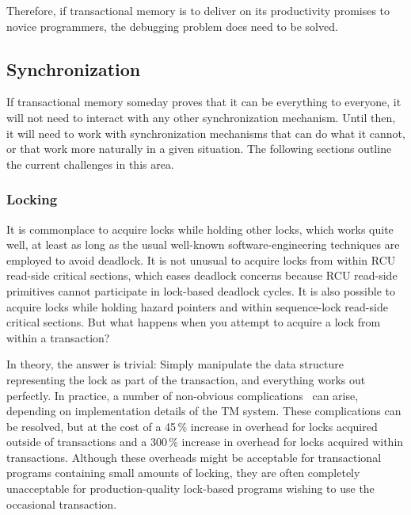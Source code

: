 Therefore, if transactional memory is to deliver on its productivity
promises to novice programmers, the debugging problem does need to
be solved.

\subsection{Synchronization}
\label{sec:future:Synchronization}

If transactional memory someday proves that it can be everything to everyone,
it will not need to interact with any other synchronization mechanism.
Until then, it will need to work with synchronization mechanisms that
can do what it cannot, or that work more naturally in a given situation.
The following sections outline the current challenges in this area.

\subsubsection{Locking}
\label{sec:future:Locking}

It is commonplace to acquire locks while holding other locks, which works
quite well, at least as long as the usual well-known software-engineering
techniques are employed to avoid deadlock.
It is not unusual to acquire locks from within RCU read-side critical
sections, which eases deadlock concerns because RCU read-side primitives
cannot participate in lock-based deadlock cycles.
It is also possible to acquire locks while holding hazard pointers and
within sequence-lock read-side critical sections.
But what happens when you attempt to acquire a lock from within a transaction?

In theory, the answer is trivial:
Simply manipulate the data structure representing the lock as part of
the transaction, and everything works out perfectly.
In practice, a number of non-obvious complications~\cite{Volos2008TRANSACT}
can arise, depending on implementation details of the TM system.
These complications can be resolved, but at the cost of a 45\,\% increase in
overhead for locks acquired outside of transactions and a 300\,\% increase
in overhead for locks acquired within transactions.
Although these overheads might be acceptable for transactional
programs containing small amounts of locking, they are often completely
unacceptable for production-quality lock-based programs wishing to use
the occasional transaction.

